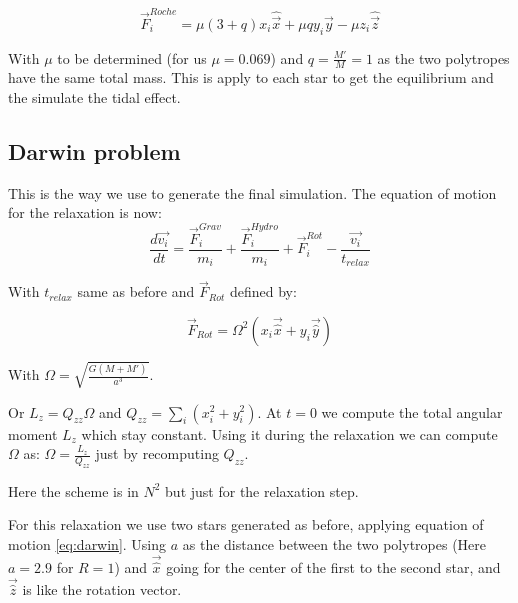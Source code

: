 \documentclass{article}
\begin{document}
$$\vec{F}_i^{Roche} = \mu (3+q) x_i \hat{\vec{x}} + \mu q y_i \hat{\vec{y}}-\mu z_i \hat{\vec{z}}$$

With $\mu$ to be determined (for us $\mu = 0.069$) and $q = \frac{M'}{M}=1$ as the two polytropes have the same total mass.
This is apply to each star to get the equilibrium and the simulate the tidal effect.

\subsection{Darwin problem}

This is the way we use to generate the final simulation.
The equation of motion for the relaxation is now:
\begin{equation}
\label{eq:darwin}
\frac{d\vec{v_i}}{dt} = \frac{\vec{F}_i^{Grav}}{m_i} +\frac{\vec{F}_i^{Hydro}}{m_i} + \vec{F}_i^{Rot} - \frac{\vec{v_i}}{t_{relax}}
\end{equation}

With $t_{relax}$ same as before and $\vec{F}_{Rot}$ defined by:

\begin{equation}
\vec{F}_{Rot} = \Omega^2(x_i \vec{\hat{x}}+y_i\vec{\hat{y}})
\end{equation}

With $\Omega = \sqrt{\frac{G(M+M')}{a^3}}$.

Or $L_z = Q_{zz}\Omega$ and $Q_{zz} = \sum_i(x_i^2+y_i^2)$. At $t=0$ we compute the total angular moment $L_z$ which stay constant.
Using it during the relaxation we can compute $\Omega$ as: $\Omega = \frac{L_z}{Q_{zz}}$ just by recomputing $Q_{zz}$.

Here the scheme is in $N^2$ but just for the relaxation step.

For this relaxation we use two stars generated as before, applying equation of motion \ref{eq:darwin}.
Using $a$ as the distance between the two polytropes  (Here $a=2.9$ for $R=1$) and $\vec{\hat{x}}$ going for the center of the first to the second star, and $\vec{\hat{z}}$ is like the rotation vector.

%
\end{document}
